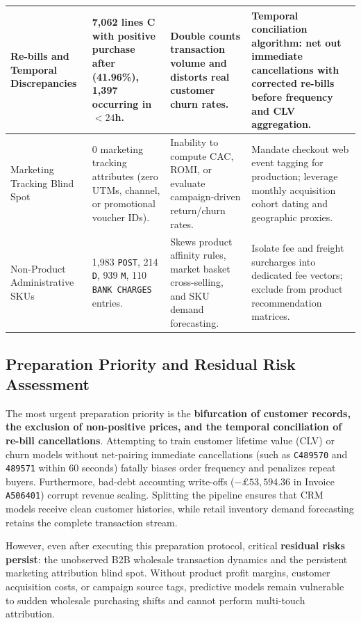 \documentclass[journal,10pt,twocolumn]{IEEEtran}
\begin{document}
\begin{table}[htbp]
\begin{tabularx}{\textwidth}{p{2.8cm}p{2.8cm}p{4.0cm}X}
\midrule
Re-bills and Temporal Discrepancies & 7,062 lines C with positive purchase after (41.96\%), 1,397 occurring in $<24$h. & Double counts transaction volume and distorts real customer churn rates. & Temporal conciliation algorithm: net out immediate cancellations with corrected re-bills before frequency and CLV aggregation. \\
\midrule
Marketing Tracking Blind Spot & 0 marketing tracking attributes (zero UTMs, channel, or promotional voucher IDs). & Inability to compute CAC, ROMI, or evaluate campaign-driven return/churn rates. & Mandate checkout web event tagging for production; leverage monthly acquisition cohort dating and geographic proxies. \\
\midrule
Non-Product Administrative SKUs & 1,983 \texttt{POST}, 214 \texttt{D}, 939 \texttt{M}, 110 \texttt{BANK CHARGES} entries. & Skews product affinity rules, market basket cross-selling, and SKU demand forecasting. & Isolate fee and freight surcharges into dedicated fee vectors; exclude from product recommendation matrices. \\
\bottomrule
\end{tabularx}
\end{table}

\subsection{Preparation Priority and Residual Risk Assessment}
The most urgent preparation priority is the \textbf{bifurcation of customer records, the exclusion of non-positive prices, and the temporal conciliation of re-bill cancellations}. Attempting to train customer lifetime value (CLV) or churn models without net-pairing immediate cancellations (such as \texttt{C489570} and \texttt{489571} within 60 seconds) fatally biases order frequency and penalizes repeat buyers. Furthermore, bad-debt accounting write-offs ($-\pounds 53,594.36$ in Invoice \texttt{A506401}) corrupt revenue scaling. Splitting the pipeline ensures that CRM models receive clean customer histories, while retail inventory demand forecasting retains the complete transaction stream.

However, even after executing this preparation protocol, critical \textbf{residual risks persist}: the unobserved B2B wholesale transaction dynamics and the persistent marketing attribution blind spot. Without product profit margins, customer acquisition costs, or campaign source tags, predictive models remain vulnerable to sudden wholesale purchasing shifts and cannot perform multi-touch attribution.
\end{document}
